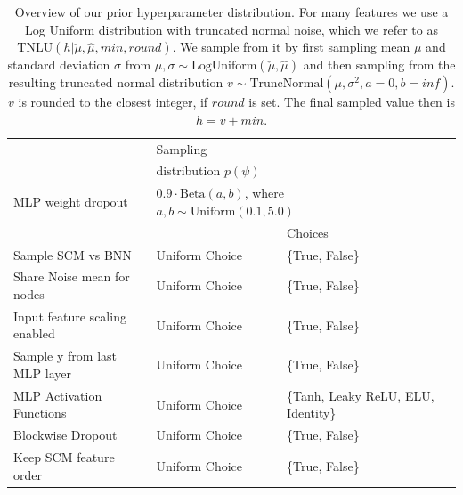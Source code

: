 \documentclass{article}
\begin{document}
\begin{table}[htbp]
\small
    \centering
    \caption{Overview of our prior hyperparameter distribution. For many features we use a Log Uniform distribution with truncated normal noise, which we refer to as $\text{TNLU}(h|\check{\mu}, \hat{\mu}, min, round)$. We sample from it by first sampling mean $\mu$ and standard deviation $\sigma$ from $\mu, \sigma \sim \text{LogUniform}(\check{\mu},\hat{\mu})$ and then sampling from the resulting truncated normal distribution $v \sim \text{TruncNormal}(\mu, \sigma^2, a=0, b=inf)$.
    $v$ is rounded to the closest integer, if $round$ is set. The final sampled value then is $h = v + min$.}
    \begin{tabular}{llllll}
    \toprule
    {} & Sampling &\\%
    {} & distribution $p(\psi)$ &  &  & & \\
    \midrule
    MLP weight dropout &\multicolumn{3}{l}{$0.9 \cdot \text{Beta}(a,b)$, where $a,b \sim \text{Uniform}(0.1,5.0)$}\\
    \toprule
    {} &  & Choices &  &  &  \\
    \midrule
    Sample SCM vs BNN &                     Uniform Choice &                                      \{True, False\} & & & \\
    Share Noise mean for nodes &                     Uniform Choice &                                      \{True, False\} & & & \\
    Input feature scaling enabled &                     Uniform Choice &                                      \{True, False\} & & & \\
    Sample y from last MLP layer         &                     Uniform Choice &                                      \{True, False\} & & &  \\
    MLP Activation Functions                   &                     Uniform Choice &  \multicolumn{4}{l}{\{Tanh, Leaky ReLU, ELU, Identity\}}  \\
    Blockwise Dropout                       &                     Uniform Choice &                                      \{True, False\} & & &  \\
    Keep SCM feature order                  &                     Uniform Choice &                                      \{True, False\} & & &  \\

\end{tabular}
\end{table}
\end{document}
